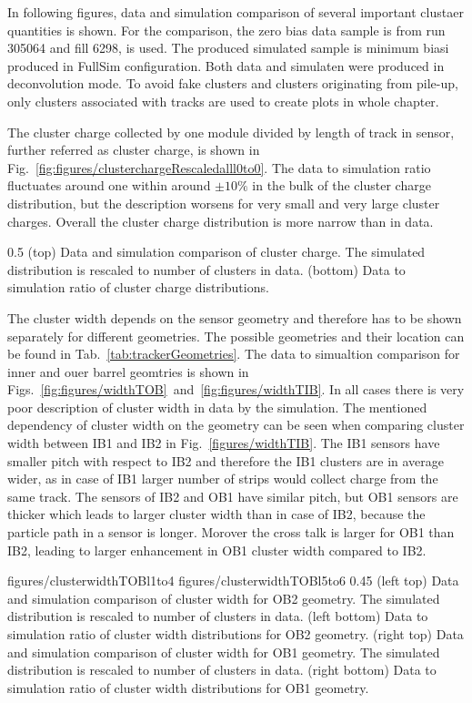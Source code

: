 In following figures, data and simulation comparison of several important clustaer quantities is shown. For the comparison, the zero bias data sample is from run 305064 and fill 6298, is used. The produced simulated sample is minimum biasi produced in FullSim configuration. Both data and simulaten were produced in deconvolution mode. To avoid fake clusters and clusters originating from pile-up, only clusters associated with tracks are used to create plots in whole chapter.
 
The cluster charge collected by one module divided by length of track in sensor, further referred as cluster charge, is shown in Fig.~\ref{fig:figures/clusterchargeRescaledalll0to0}. The data to simulation ratio fluctuates around one within around $\pm 10\%$ in the bulk of  the cluster charge distribution, but the description worsens for very small and very large cluster charges. Overall the cluster charge distribution is more narrow than in data. 

                 {0.5}       %
                 { (top) Data and simulation  comparison of cluster charge. The simulated distribution is rescaled to number of clusters in data. (bottom) Data to simulation ratio of cluster charge distributions. }

The cluster width depends on the sensor geometry and therefore has to be shown separately for different geometries. The possible geometries and their location can be found in Tab.~\ref{tab:trackerGeometries}. The data to simualtion comparison for inner and ouer barrel geomtries is shown in Figs.~\ref{fig:figures/widthTOB}~and~\ref{fig:figures/widthTIB}. In all cases there is very poor description of cluster width in data by the simulation. The mentioned dependency of cluster width on the geometry can be seen when comparing cluster width between IB1 and IB2 in Fig.~\ref{figures/widthTIB}. The IB1 sensors have smaller pitch with respect to IB2 and therefore the IB1 clusters are in average wider, as in case of IB1 larger number of strips would collect charge from the same track. The sensors of IB2 and OB1 have similar pitch, but OB1 sensors are thicker which leads to larger cluster width than in case of IB2, because the particle path in a sensor is longer. Morover the cross talk is larger for OB1 than IB2, leading to larger enhancement in OB1 cluster width compared to IB2.

                 {figures/clusterwidthTOBl1to4}
                 {figures/clusterwidthTOBl5to6} %
                 {0.45}       %
                 {(left top) Data and simulation  comparison of cluster width for OB2 geometry. The simulated distribution is rescaled to number of clusters in data. (left bottom) Data to simulation ratio of cluster width distributions for OB2 geometry. (right top) Data and simulation  comparison of cluster width for OB1 geometry. The simulated distribution is rescaled to number of clusters in data. (right bottom) Data to simulation ratio of cluster width distributions for OB1 geometry. }

